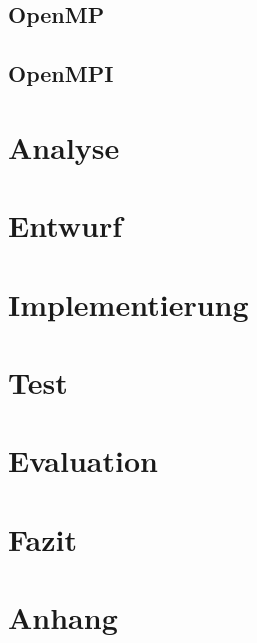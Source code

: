 \documentclass[12pt,a4paper,ngerman]{article}
\begin{document}
\subsection{OpenMP}
\subsection{OpenMPI}

\section{Analyse}

\section{Entwurf}

\section{Implementierung}

\section{Test}

\section{Evaluation}

\section{Fazit}

\section{Anhang}
\end{document}
